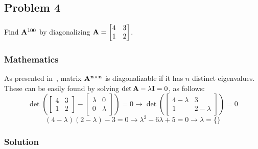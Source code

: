 \subsection{Problem 4}%
\label{sec:problem_4}

Find $\mathbf{A}^{100}$ by diagonalizing $\mathbf{A} = 
\begin{bmatrix}
    4 & 3\\
    1 & 2
\end{bmatrix}$.

\subsubsection*{Mathematics}

As presented in~\cite{Zdunek}, matrix $\mathbf{A^{n\times n}}$ is diagonalizable if it has 
$n$ distinct eigenvalues.
These can be easily found by solving $\det{\mathbf{A} - \lambda\mathbf{I}} = 0$, as follows:
\begin{equation*}
    \det{\left(\begin{bmatrix}
        4 & 3 \\
        1 & 2 
    \end{bmatrix} - 
    \begin{bmatrix}
        \lambda & 0 \\
        0 & \lambda
    \end{bmatrix}\right)} = 0 \rightarrow
    \det{\left(\begin{bmatrix}
        4 - \lambda & 3 \\
        1 & 2 - \lambda
    \end{bmatrix}\right)} = 0
\end{equation*}
\begin{equation*}
    (4 - \lambda)(2 - \lambda) - 3 = 0 \rightarrow
    \lambda^2 - 6\lambda + 5 = 0 \rightarrow
    \lambda = \{\}
\end{equation*}


\subsubsection*{Solution}
